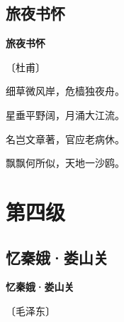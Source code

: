 \documentclass[12pt,UTF-8,openany,fontset=none]{ctexbook}
\begin{document}
\vspace{8pt}
\clearpage

\section{旅夜书怀}


\begin{center}
    {\bfseries 旅夜书怀}

    \vspace{18pt}

    \begin{large}\xuwen
        〔杜甫〕
    \end{large}

\end{center}

    \vspace{18pt}  %

\begin{center}
    \begin{Large}

        细草微风岸，危樯独夜舟。

        星垂平野阔，月涌大江流。

        名岂文章著，官应老病休。

        飘飘何所似，天地一沙鸥。

    \end{Large}

\end{center}

\vspace{8pt}
\clearpage

\chapter{第四级}
\clearpage

\section{忆秦娥·娄山关}


\begin{center}
    {\bfseries 忆秦娥·娄山关}

    \vspace{18pt}

    \begin{large}\xuwen
        〔毛泽东〕
    \end{large}

\end{center}
\end{document}
